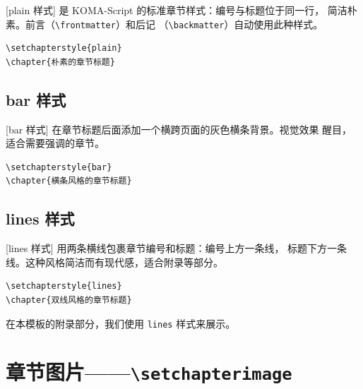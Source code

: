 {}[plain 样式] 是 KOMA-Script 的标准章节样式：编号与标题位于同一行，
简洁朴素。前言（\texttt{\textbackslash frontmatter}）和后记
（\texttt{\textbackslash backmatter}）自动使用此种样式。

\begin{lstlisting}
\setchapterstyle{plain}
\chapter{朴素的章节标题}
\end{lstlisting}

\subsection{bar 样式}

{}[bar 样式] 在章节标题后面添加一个横跨页面的灰色横条背景。视觉效果
醒目，适合需要强调的章节。

\begin{lstlisting}
\setchapterstyle{bar}
\chapter{横条风格的章节标题}
\end{lstlisting}

\subsection{lines 样式}

{}[lines 样式] 用两条横线包裹章节编号和标题：编号上方一条线，
标题下方一条线。这种风格简洁而有现代感，适合附录等部分。

\begin{lstlisting}
\setchapterstyle{lines}
\chapter{双线风格的章节标题}
\end{lstlisting}

在本模板的附录部分，我们使用 \texttt{lines} 样式来展示。


\section{章节图片——\texttt{\textbackslash setchapterimage}}

